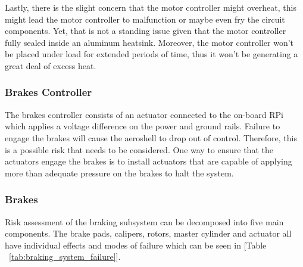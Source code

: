 Lastly, there is the slight concern that the motor controller might overheat, this might lead the motor controller to malfunction or maybe even fry the circuit components. Yet, that is not a standing issue given that the motor controller fully sealed inside an aluminum heatsink. Moreover, the motor controller won't be placed under load for extended periods of time, thus it won't be generating a great deal of excess heat.

\subsubsection*{Brakes Controller}

\indent\indent The brakes controller consists of an actuator connected to the on-board RPi which applies a voltage difference on the power and ground rails. Failure to engage the brakes will cause the aeroshell to drop out of control. Therefore, this is a possible risk that needs to be considered. One way to ensure that the actuators engage the brakes is to install actuators that are capable of applying more than adequate pressure on the brakes to halt the system.


\subsubsection{Brakes}

\indent\indent Risk assessment of the braking subsystem can be decomposed into five main components.  The brake pads, calipers, rotors, master cylinder and actuator all have individual effects and modes of failure which can be seen in [Table ~\ref{tab:braking_system_failure}].

